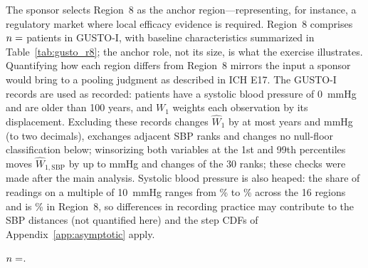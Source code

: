 \documentclass[AMA,Times1COL]{WileyNJDv5}
\begin{document}
The sponsor selects Region~8 as the anchor region---representing, for instance, a regulatory market where local efficacy evidence is required. Region~8 comprises $n = \numval{nR8}$ patients in GUSTO-I, with baseline characteristics summarized in Table~\ref{tab:gusto_r8}; the anchor role, not its size, is what the exercise illustrates. Quantifying how each region differs from Region~8 mirrors the input a sponsor would bring to a pooling judgment as described in ICH E17.\cite{iche17} The GUSTO-I records are used as recorded:  patients have a systolic blood pressure of 0~mmHg and  are older than 100 years, and $W_1$ weights each observation by its displacement. Excluding these records changes $\widehat{W}_1$ by at most  years and  mmHg (to two decimals), exchanges  adjacent SBP ranks and changes no null-floor classification below; winsorizing both variables at the 1st and 99th percentiles moves $\widehat{W}_{1,\text{SBP}}$ by up to  mmHg and changes  of the 30 ranks; these checks were made after the main analysis. Systolic blood pressure is also heaped: the share of readings on a multiple of 10~mmHg ranges from \% to \% across the 16 regions and is \% in Region~8, so differences in recording practice may contribute to the SBP distances (not quantified here) and the step CDFs of Appendix~\ref{app:asymptotic} apply.

\begin{table}[ht]
\centering
\caption{Region~8 baseline characteristics (GUSTO-I).\label{tab:gusto_r8}}
\begin{tablenotes}
\item $n = \numval{nR8note}$.
\end{tablenotes}
\end{table}
\end{document}
